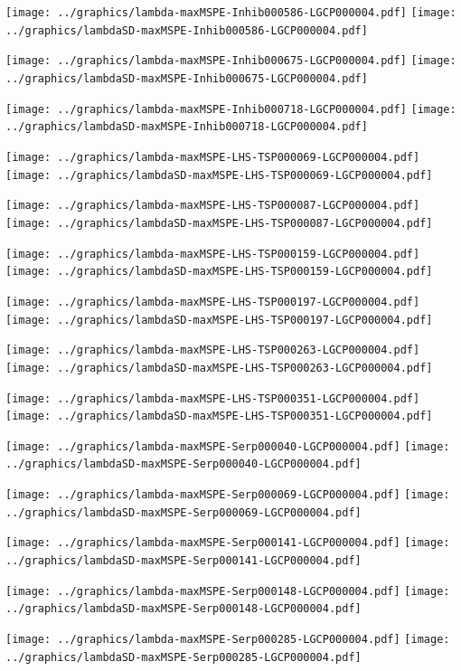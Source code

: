 \documentclass[review]{elsarticle}
\begin{document}
\texttt{[image: ../graphics/lambda-maxMSPE-Inhib000586-LGCP000004.pdf]}
\texttt{[image: ../graphics/lambdaSD-maxMSPE-Inhib000586-LGCP000004.pdf]}

\texttt{[image: ../graphics/lambda-maxMSPE-Inhib000675-LGCP000004.pdf]}
\texttt{[image: ../graphics/lambdaSD-maxMSPE-Inhib000675-LGCP000004.pdf]}

\texttt{[image: ../graphics/lambda-maxMSPE-Inhib000718-LGCP000004.pdf]}
\texttt{[image: ../graphics/lambdaSD-maxMSPE-Inhib000718-LGCP000004.pdf]}

\texttt{[image: ../graphics/lambda-maxMSPE-LHS-TSP000069-LGCP000004.pdf]}
\texttt{[image: ../graphics/lambdaSD-maxMSPE-LHS-TSP000069-LGCP000004.pdf]}

\texttt{[image: ../graphics/lambda-maxMSPE-LHS-TSP000087-LGCP000004.pdf]}
\texttt{[image: ../graphics/lambdaSD-maxMSPE-LHS-TSP000087-LGCP000004.pdf]}

\texttt{[image: ../graphics/lambda-maxMSPE-LHS-TSP000159-LGCP000004.pdf]}
\texttt{[image: ../graphics/lambdaSD-maxMSPE-LHS-TSP000159-LGCP000004.pdf]}

\texttt{[image: ../graphics/lambda-maxMSPE-LHS-TSP000197-LGCP000004.pdf]}
\texttt{[image: ../graphics/lambdaSD-maxMSPE-LHS-TSP000197-LGCP000004.pdf]}

\texttt{[image: ../graphics/lambda-maxMSPE-LHS-TSP000263-LGCP000004.pdf]}
\texttt{[image: ../graphics/lambdaSD-maxMSPE-LHS-TSP000263-LGCP000004.pdf]}

\texttt{[image: ../graphics/lambda-maxMSPE-LHS-TSP000351-LGCP000004.pdf]}
\texttt{[image: ../graphics/lambdaSD-maxMSPE-LHS-TSP000351-LGCP000004.pdf]}

\texttt{[image: ../graphics/lambda-maxMSPE-Serp000040-LGCP000004.pdf]}
\texttt{[image: ../graphics/lambdaSD-maxMSPE-Serp000040-LGCP000004.pdf]}

\texttt{[image: ../graphics/lambda-maxMSPE-Serp000069-LGCP000004.pdf]}
\texttt{[image: ../graphics/lambdaSD-maxMSPE-Serp000069-LGCP000004.pdf]}

\texttt{[image: ../graphics/lambda-maxMSPE-Serp000141-LGCP000004.pdf]}
\texttt{[image: ../graphics/lambdaSD-maxMSPE-Serp000141-LGCP000004.pdf]}

\texttt{[image: ../graphics/lambda-maxMSPE-Serp000148-LGCP000004.pdf]}
\texttt{[image: ../graphics/lambdaSD-maxMSPE-Serp000148-LGCP000004.pdf]}

\texttt{[image: ../graphics/lambda-maxMSPE-Serp000285-LGCP000004.pdf]}
\texttt{[image: ../graphics/lambdaSD-maxMSPE-Serp000285-LGCP000004.pdf]}
\end{document}
